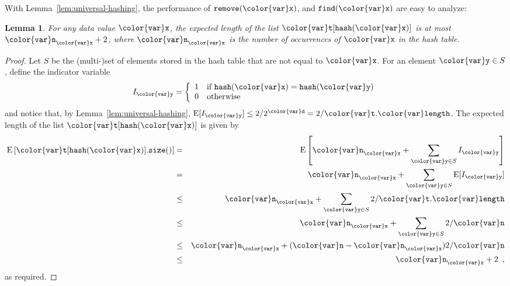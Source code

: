 \documentclass[10pt]{book}
\theoremstyle{plain}
\newtheorem{lem}{Lemma}[chapter]
\newcommand{\lemref}[1]{Lemma~\ref{lem:#1}}
\theoremstyle{definition}
\newcommand{\E}{\mathrm{E}}
\begin{document}
With \lemref{universal-hashing}, the performance of \ensuremath{\mathtt{remove({\color{var}x})}}, and
\ensuremath{\mathtt{find({\color{var}x})}} are easy to analyze:

\begin{lem}
  For any data value \ensuremath{\mathtt{{\color{var}x}}}, the expected length of the list \ensuremath{\mathtt{{\color{var}t}[hash({\color{var}x})]}}
  is at most $\ensuremath{\mathtt{{\color{var}n}}}_{\ensuremath{\mathtt{{\color{var}x}}}} + 2$, where $\ensuremath{\mathtt{{\color{var}n}}}_{\ensuremath{\mathtt{{\color{var}x}}}}$ is the number of
  occurrences of \ensuremath{\mathtt{{\color{var}x}}} in the hash table.
\end{lem}

\begin{proof}
  Let $S$ be the (multi-)set of elements stored in the hash table that
  are not equal to \ensuremath{\mathtt{{\color{var}x}}}.  For an element $\ensuremath{\mathtt{{\color{var}y}}}\in S$, define the indicator
  variable
    \[ I_{\ensuremath{\mathtt{{\color{var}y}}}} = \left\{\begin{array}{ll}
       1 & \mbox{if $\ensuremath{\mathtt{hash({\color{var}x})}}=\ensuremath{\mathtt{hash({\color{var}y})}}$} \\
       0 & \mbox{otherwise}
       \end{array}\right.
    \]
  and notice that, by \lemref{universal-hashing}, $\E[I_{\ensuremath{\mathtt{{\color{var}y}}}}] \le
  2/2^{\ensuremath{\mathtt{{\color{var}d}}}}=2/\ensuremath{\mathtt{{\color{var}t}.{\color{var}length}}}$.  The expected length of the list \ensuremath{\mathtt{{\color{var}t}[hash({\color{var}x})]}}
  is given by
  \begin{eqnarray*}
   \E\left[\ensuremath{\mathtt{{\color{var}t}[hash({\color{var}x})].size()}}\right] &=& \E\left[\ensuremath{\mathtt{{\color{var}n}}}_{\ensuremath{\mathtt{{\color{var}x}}}} + \sum_{\ensuremath{\mathtt{{\color{var}y}}}\in S} I_{\ensuremath{\mathtt{{\color{var}y}}}}\right] \\
    &=& \ensuremath{\mathtt{{\color{var}n}}}_{\ensuremath{\mathtt{{\color{var}x}}}} + \sum_{\ensuremath{\mathtt{{\color{var}y}}}\in S} \E [I_{\ensuremath{\mathtt{{\color{var}y}}}} ] \\
    &\le& \ensuremath{\mathtt{{\color{var}n}}}_{\ensuremath{\mathtt{{\color{var}x}}}} + \sum_{\ensuremath{\mathtt{{\color{var}y}}}\in S} 2/\ensuremath{\mathtt{{\color{var}t}.{\color{var}length}}} \\
    &\le& \ensuremath{\mathtt{{\color{var}n}}}_{\ensuremath{\mathtt{{\color{var}x}}}} + \sum_{\ensuremath{\mathtt{{\color{var}y}}}\in S} 2/\ensuremath{\mathtt{{\color{var}n}}} \\
    &\le& \ensuremath{\mathtt{{\color{var}n}}}_{\ensuremath{\mathtt{{\color{var}x}}}} + (\ensuremath{\mathtt{{\color{var}n}}}-\ensuremath{\mathtt{{\color{var}n}}}_{\ensuremath{\mathtt{{\color{var}x}}}})2/\ensuremath{\mathtt{{\color{var}n}}} \\
    &\le& \ensuremath{\mathtt{{\color{var}n}}}_{\ensuremath{\mathtt{{\color{var}x}}}} + 2 \enspace ,
  \end{eqnarray*}
  as required.
\end{proof}
\end{document}
